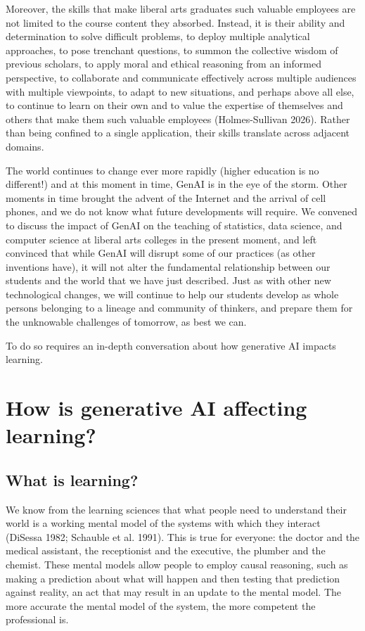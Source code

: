 \documentclass[
]{hdsr}
\begin{document}
Moreover, the skills that make liberal arts graduates such valuable
employees are not limited to the course content they absorbed. Instead,
it is their ability and determination to solve difficult problems, to
deploy multiple analytical approaches, to pose trenchant questions, to
summon the collective wisdom of previous scholars, to apply moral and
ethical reasoning from an informed perspective, to collaborate and
communicate effectively across multiple audiences with multiple
viewpoints, to adapt to new situations, and perhaps above all else, to
continue to learn on their own and to value the expertise of themselves
and others that make them such valuable employees (Holmes-Sullivan
2026). Rather than being confined to a single application, their skills
translate across adjacent domains.

The world continues to change ever more rapidly (higher education is no
different!) and at this moment in time, GenAI is in the eye of the
storm. Other moments in time brought the advent of the Internet and the
arrival of cell phones, and we do not know what future developments will
require. We convened to discuss the impact of GenAI on the teaching of
statistics, data science, and computer science at liberal arts colleges
in the present moment, and left convinced that while GenAI will disrupt
some of our practices (as other inventions have), it will not alter the
fundamental relationship between our students and the world that we have
just described. Just as with other new technological changes, we will
continue to help our students develop as whole persons belonging to a
lineage and community of thinkers, and prepare them for the unknowable
challenges of tomorrow, as best we can.

To do so requires an in-depth conversation about how generative AI
impacts learning.

\section{How is generative AI affecting
learning?}\label{how-is-generative-ai-affecting-learning}

\subsection{What is learning?}\label{what-is-learning}

We know from the learning sciences that what people need to understand
their world is a working mental model of the systems with which they
interact (DiSessa 1982; Schauble et al. 1991). This is true for
everyone: the doctor and the medical assistant, the receptionist and the
executive, the plumber and the chemist. These mental models allow people
to employ causal reasoning, such as making a prediction about what will
happen and then testing that prediction against reality, an act that may
result in an update to the mental model. The more accurate the mental
model of the system, the more competent the professional is.
\end{document}
